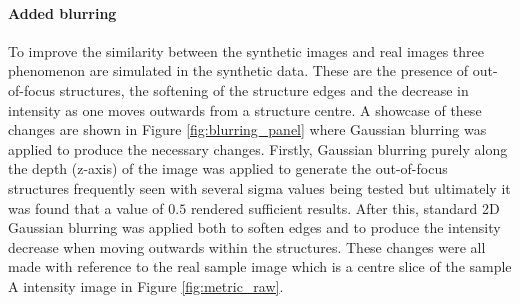 \paragraph{Added blurring}
To improve the similarity between the synthetic images and real images three phenomenon are simulated in the synthetic data. These are the presence of out-of-focus structures, the softening of the structure edges and the decrease in intensity as one moves outwards from a structure centre. A showcase of these changes are shown in Figure \ref{fig:blurring_panel} where Gaussian blurring was applied to produce the necessary changes. Firstly, Gaussian blurring purely along the depth (z-axis) of the image was applied to generate the out-of-focus structures frequently seen with several sigma values being tested but ultimately it was found that a value of $0.5$ rendered sufficient results. After this, standard 2D Gaussian blurring was applied both to soften edges and to produce the intensity decrease when moving outwards within the structures. These changes were all made with reference to the real sample image which is a centre slice of the sample A intensity image in Figure \ref{fig:metric_raw}.

